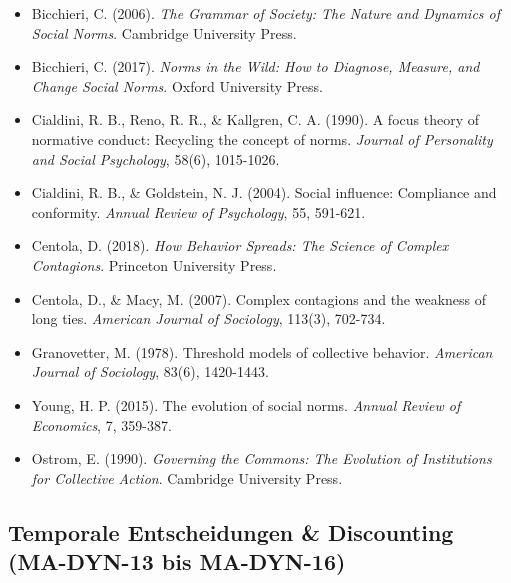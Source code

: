 \begin{itemize}[leftmargin=*]
    \item Bicchieri, C. (2006). \textit{The Grammar of Society: The Nature and Dynamics of Social Norms}. Cambridge University Press.
    \item Bicchieri, C. (2017). \textit{Norms in the Wild: How to Diagnose, Measure, and Change Social Norms}. Oxford University Press.
    \item Cialdini, R. B., Reno, R. R., \& Kallgren, C. A. (1990). A focus theory of normative conduct: Recycling the concept of norms. \textit{Journal of Personality and Social Psychology}, 58(6), 1015-1026.
    \item Cialdini, R. B., \& Goldstein, N. J. (2004). Social influence: Compliance and conformity. \textit{Annual Review of Psychology}, 55, 591-621.
    \item Centola, D. (2018). \textit{How Behavior Spreads: The Science of Complex Contagions}. Princeton University Press.
    \item Centola, D., \& Macy, M. (2007). Complex contagions and the weakness of long ties. \textit{American Journal of Sociology}, 113(3), 702-734.
    \item Granovetter, M. (1978). Threshold models of collective behavior. \textit{American Journal of Sociology}, 83(6), 1420-1443.
    \item Young, H. P. (2015). The evolution of social norms. \textit{Annual Review of Economics}, 7, 359-387.
    \item Ostrom, E. (1990). \textit{Governing the Commons: The Evolution of Institutions for Collective Action}. Cambridge University Press.
\end{itemize}

\subsection*{Temporale Entscheidungen \& Discounting (MA-DYN-13 bis MA-DYN-16)}

